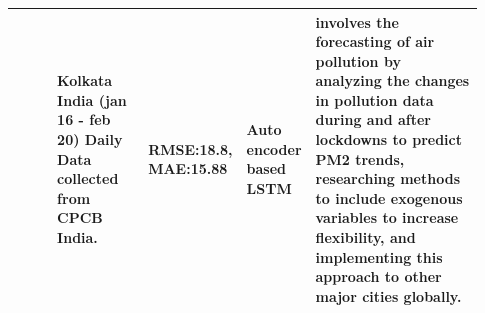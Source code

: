 \documentclass[a4paper,fleqn]{cas-dc}
\begin{document}
\begin{landscape}
{\begin{longtable}[h!]{ p{0.1\linewidth} p{0.2\linewidth} p{0.14\linewidth} p{0.11\linewidth} p{0.38\linewidth} }
\cite{nath2021long}       & Kolkata India (jan 16 - feb   20)  Daily Data collected from CPCB   India.                               & RMSE:18.8, MAE:15.88                                                                                    & Auto encoder based LSTM                                             &  involves the forecasting of air pollution by analyzing the changes in pollution data during and after lockdowns to predict PM2 trends, researching methods to include exogenous variables to increase flexibility, and implementing this approach to other major cities globally.          \\ \hline
  \end{longtable}}
  \end{landscape}

  
\end{document}
